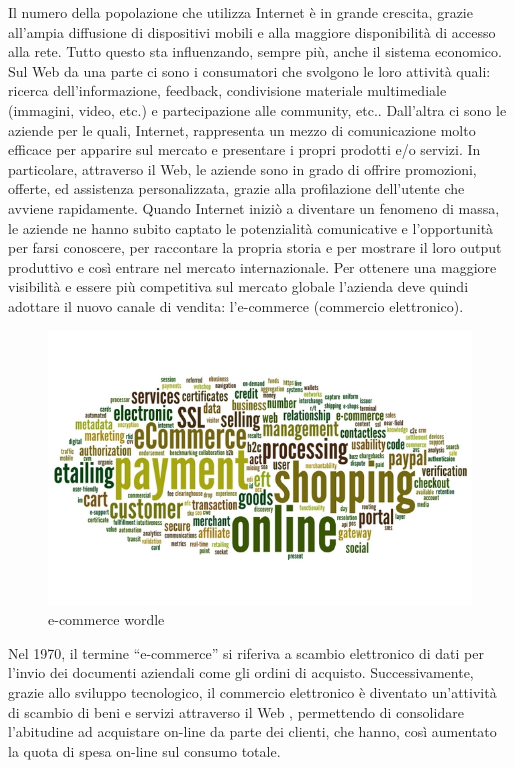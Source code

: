 Il numero della popolazione che utilizza Internet è in grande crescita, grazie all’ampia diffusione di dispositivi mobili e alla maggiore disponibilità di accesso alla rete. Tutto questo sta influenzando, sempre più, anche il sistema economico. Sul Web da una parte ci sono i consumatori che svolgono le loro attività quali: ricerca dell’informazione, feedback, condivisione materiale multimediale (immagini, video, etc.) e partecipazione alle community, etc.. Dall’altra ci sono le aziende per le quali, Internet, rappresenta un mezzo di comunicazione molto efficace per apparire sul mercato e presentare i propri prodotti e/o servizi. In particolare, attraverso il Web, le aziende sono in grado di offrire promozioni, offerte, ed assistenza personalizzata, grazie alla profilazione dell’utente che avviene rapidamente.
\newline
Quando Internet iniziò a diventare un fenomeno di massa, le aziende ne hanno subito captato le potenzialità comunicative e l’opportunità per farsi conoscere, per raccontare la propria storia e per mostrare il loro output produttivo e così entrare nel mercato internazionale.
\newline
Per ottenere una maggiore visibilità e essere più competitiva sul mercato globale l’azienda deve quindi adottare il nuovo canale di vendita: l’e-commerce (commercio elettronico).
\begin{figure}[htb]
 \centering
 \includegraphics[width=1.0\linewidth]{images/introduction/ecommerce-wordle.jpg}\hfill
 \caption[e-commerce wordle]{e-commerce wordle}
 \label{fig:e_commerce_wordle}
\end{figure}
Nel 1970, il termine “e-commerce” si riferiva a scambio elettronico di dati per l’invio dei documenti aziendali come gli ordini di acquisto. Successivamente, grazie allo sviluppo tecnologico, il commercio elettronico è diventato un’attività di scambio di beni e servizi attraverso il Web \cite{commerce_intro_1}, permettendo di consolidare l’abitudine ad acquistare on-line da parte dei clienti, che hanno, così aumentato la quota di spesa on-line sul consumo totale.
